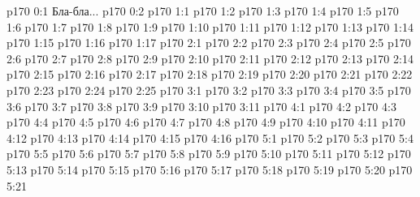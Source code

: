 \author{Промежуточные создания}
\vs p170 0:1  Бла-бла...
\vs p170 0:2 
\vs p170 1:1 
\vs p170 1:2 
\vs p170 1:3 
\vs p170 1:4 
\vs p170 1:5 
\vs p170 1:6 
\vs p170 1:7 \pc 
\vs p170 1:8 
\vs p170 1:9 
\vs p170 1:10 
\vs p170 1:11 
\vs p170 1:12 
\vs p170 1:13 \pc 
\vs p170 1:14 
\vs p170 1:15 
\vs p170 1:16 
\vs p170 1:17 
\vs p170 2:1 
\vs p170 2:2 
\vs p170 2:3 
\vs p170 2:4 
\vs p170 2:5 
\vs p170 2:6 
\vs p170 2:7 
\vs p170 2:8 
\vs p170 2:9 \pc 
\vs p170 2:10 
\vs p170 2:11 
\vs p170 2:12 
\vs p170 2:13 
\vs p170 2:14 
\vs p170 2:15 
\vs p170 2:16 \pc 
\vs p170 2:17 
\vs p170 2:18 
\vs p170 2:19 
\vs p170 2:20 
\vs p170 2:21 
\vs p170 2:22 
\vs p170 2:23 
\vs p170 2:24 
\vs p170 2:25 
\vs p170 3:1 
\vs p170 3:2 
\vs p170 3:3 
\vs p170 3:4 
\vs p170 3:5 
\vs p170 3:6 
\vs p170 3:7 
\vs p170 3:8 \pc 
\vs p170 3:9 
\vs p170 3:10 
\vs p170 3:11 
\vs p170 4:1 
\vs p170 4:2 
\vs p170 4:3 
\vs p170 4:4 
\vs p170 4:5 
\vs p170 4:6 
\vs p170 4:7 \pc 
\vs p170 4:8 
\vs p170 4:9 
\vs p170 4:10 
\vs p170 4:11 
\vs p170 4:12 
\vs p170 4:13 
\vs p170 4:14 \pc 
\vs p170 4:15 
\vs p170 4:16 
\vs p170 5:1 
\vs p170 5:2 
\vs p170 5:3 
\vs p170 5:4 
\vs p170 5:5 
\vs p170 5:6 
\vs p170 5:7 \pc 
\vs p170 5:8 
\vs p170 5:9 
\vs p170 5:10 
\vs p170 5:11 
\vs p170 5:12 
\vs p170 5:13 
\vs p170 5:14 
\vs p170 5:15 
\vs p170 5:16 
\vs p170 5:17 
\vs p170 5:18 
\vs p170 5:19 
\vs p170 5:20 
\vs p170 5:21 
\quizlink

